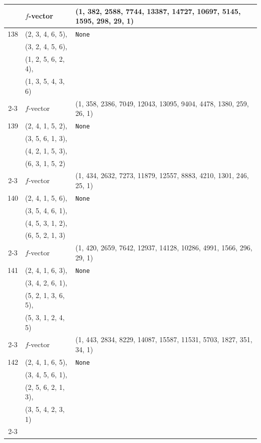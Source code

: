 \documentclass[10pt]{amsart}
\numberwithin{equation}{section}
\theoremstyle{plain}
\theoremstyle{definition}
\theoremstyle{remark}
\begin{document}
{\begin{longtable}{c|l|l}
		& $f$-vector & {(1, 382, 2588, 7744, 13387, 14727, 10697, 5145, 1595, 298, 29, 1)} \\
		\midrule
		
		138 & (2, 3, 4, 6, 5), & \texttt{None} \\
		& (3, 2, 4, 5, 6), &  \\
		& (1, 2, 5, 6, 2, 4), &  \\
		& (1, 3, 5, 4, 3, 6) &  \\ \cline{2-3}
		
		& $f$-vector & {(1, 358, 2386, 7049, 12043, 13095, 9404, 4478, 1380, 259, 26, 1)} \\
		\midrule
		
		139 & (2, 4, 1, 5, 2), & \texttt{None} \\
		& (3, 5, 6, 1, 3), &  \\
		& (4, 2, 1, 5, 3), &  \\
		& (6, 3, 1, 5, 2) &  \\ \cline{2-3}
		
		& $f$-vector & {(1, 434, 2632, 7273, 11879, 12557, 8883, 4210, 1301, 246, 25, 1)} \\
		\midrule
		
		140 & (2, 4, 1, 5, 6), & \texttt{None} \\
		& (3, 5, 4, 6, 1), &  \\
		& (4, 5, 3, 1, 2), &  \\
		& (6, 5, 2, 1, 3) &  \\ \cline{2-3}
		
		& $f$-vector & {(1, 420, 2659, 7642, 12937, 14128, 10286, 4991, 1566, 296, 29, 1)} \\
		\midrule
		
		141 & (2, 4, 1, 6, 3), & \texttt{None} \\
		& (3, 4, 2, 6, 1), &  \\
		& (5, 2, 1, 3, 6, 5), &  \\
		& (5, 3, 1, 2, 4, 5) &  \\ \cline{2-3}
		
		& $f$-vector & {(1, 443, 2834, 8229, 14087, 15587, 11531, 5703, 1827, 351, 34, 1)} \\
		\midrule
		
		142 & (2, 4, 1, 6, 5), & \texttt{None} \\
		& (3, 4, 5, 6, 1), &  \\
		& (2, 5, 6, 2, 1, 3), &  \\
		& (3, 5, 4, 2, 3, 1) &  \\ \cline{2-3}
		

\end{longtable}}
\end{document}

